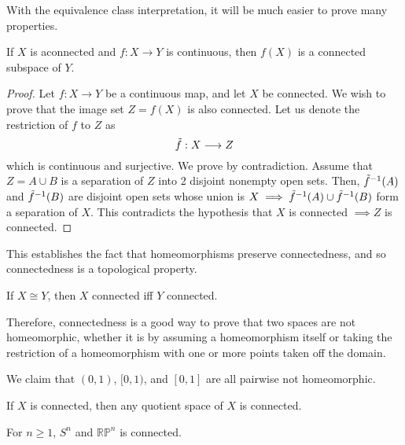   With the equivalence class interpretation, it will be much easier to prove many properties. 

  \begin{theorem}
    If $X$ is aconnected and $f: X \rightarrow Y$ is continuous, then $f(X)$ is a connected subspace of $Y$. 
  \end{theorem}
  \begin{proof}
    Let $f: X \longrightarrow Y$ be a continuous map, and let $X$ be connected. We wish to prove that the image set $Z = f(X)$ is also connected. Let us denote the restriction of $f$ to $Z$ as
    \begin{equation}
      \Tilde{f}: X \longrightarrow Z
    \end{equation}
    which is continuous and surjective. We prove by contradiction. Assume that $Z = A \cup B$ is a separation of $Z$ into 2 disjoint nonempty open sets. Then, $\Tilde{f}^{-1} (A)$ and $\Tilde{f}^{-1}(B)$ are disjoint open sets whose union is $X \implies \Tilde{f}^{-1} (A) \cup \Tilde{f}^{-1}(B)$ form a separation of $X$. This contradicts the hypothesis that $X$ is connected $\implies Z$ is connected.  
  \end{proof} 

  This establishes the fact that homeomorphisms preserve connectedness, and so connectedness is a topological property.  

  \begin{corollary}
    If $X \cong Y$, then $X$ connected iff $Y$ connected. 
  \end{corollary}

  Therefore, connectedness is a good way to prove that two spaces are not homeomorphic, whether it is by assuming a homeomorphism itself or taking the restriction of a homeomorphism with one or more points taken off the domain. 

  \begin{example}
    We claim that $(0, 1)$, $[0, 1)$, and $[0, 1]$ are all pairwise not homeomorphic. 
  \end{example}

  \begin{corollary}
    If $X$ is connected, then any quotient space of $X$ is connected. 
  \end{corollary}

  \begin{example}
    For $n \geq 1$, $S^n$ and $\mathbb{RP}^n$ is connected. 
  \end{example}

